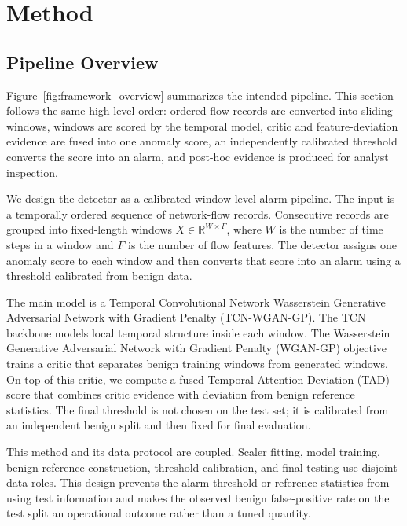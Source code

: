 \section{Method}\label{sec:method}

\subsection{Pipeline Overview}

Figure~\ref{fig:framework_overview} summarizes the intended pipeline. This section follows the same high-level order: ordered flow records are converted into sliding windows, windows are scored by the temporal model, critic and feature-deviation evidence are fused into one anomaly score, an independently calibrated threshold converts the score into an alarm, and post-hoc evidence is produced for analyst inspection.

We design the detector as a calibrated window-level alarm pipeline. The input is a temporally ordered sequence of network-flow records. Consecutive records are grouped into fixed-length windows \(X\in\mathbb{R}^{W\times F}\), where \(W\) is the number of time steps in a window and \(F\) is the number of flow features. The detector assigns one anomaly score to each window and then converts that score into an alarm using a threshold calibrated from benign data.

The main model is a Temporal Convolutional Network Wasserstein Generative Adversarial Network with Gradient Penalty (TCN-WGAN-GP). The TCN backbone models local temporal structure inside each window. The Wasserstein Generative Adversarial Network with Gradient Penalty (WGAN-GP) objective trains a critic that separates benign training windows from generated windows. On top of this critic, we compute a fused Temporal Attention-Deviation (TAD) score that combines critic evidence with deviation from benign reference statistics. The final threshold is not chosen on the test set; it is calibrated from an independent benign split and then fixed for final evaluation.

This method and its data protocol are coupled. Scaler fitting, model training, benign-reference construction, threshold calibration, and final testing use disjoint data roles. This design prevents the alarm threshold or reference statistics from using test information and makes the observed benign false-positive rate on the test split an operational outcome rather than a tuned quantity.

